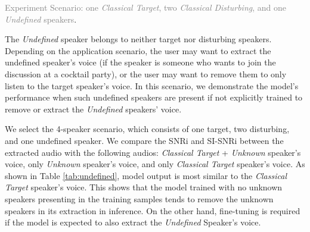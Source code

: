 \textcolor{gray}{
Experiment Scenario: one \textit{Classical Target}, two \textit{Classical Disturbing}, and one \textit{Undefined} speakers}.

The \textit{Undefined} speaker belongs to neither target nor disturbing speakers. Depending on the application scenario, the user may want to extract the undefined speaker's voice (if the speaker is someone who wants to join the discussion at a cocktail party), or the user may want to remove them to only listen to the target speaker's voice. In this scenario, we demonstrate the model's performance when such undefined speakers are present if not explicitly trained to remove or extract the \textit{Undefined} speakers' voice. 

We select the 4-speaker scenario, which consists of one target, two disturbing, and one undefined speaker. We compare the SNRi and SI-SNRi between the extracted audio with the following audios: \textit{Classical Target} + \textit{Unknown} speaker's voice, only \textit{Unknown} speaker's voice, and only \textit{Classical Target} speaker's voice. As shown in Table \ref{tab:undefined}, model output is most similar to the \textit{Classical Target} speaker's voice. This shows that the model trained with no unknown speakers presenting in the training samples tends to remove the unknown speakers in its extraction in inference. On the other hand, fine-tuning is required if the model is expected to also extract the \textit{Undefined} Speaker's voice.
